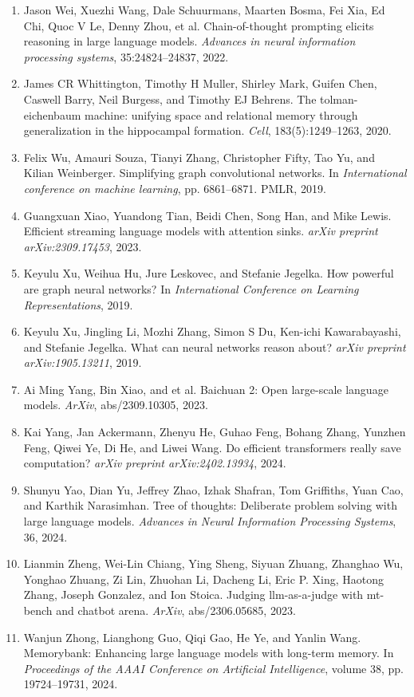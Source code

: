 \documentclass[11pt,UTF8,fontset=fandol]{ctexart}
\begin{document}
\begin{enumerate}[leftmargin=2em]
\item Jason Wei, Xuezhi Wang, Dale Schuurmans, Maarten Bosma, Fei Xia, Ed Chi, Quoc V Le, Denny Zhou, et al. Chain-of-thought prompting elicits reasoning in large language models. \textit{Advances in neural information processing systems}, 35:24824--24837, 2022.
\item James CR Whittington, Timothy H Muller, Shirley Mark, Guifen Chen, Caswell Barry, Neil Burgess, and Timothy EJ Behrens. The tolman-eichenbaum machine: unifying space and relational memory through generalization in the hippocampal formation. \textit{Cell}, 183(5):1249--1263, 2020.
\item Felix Wu, Amauri Souza, Tianyi Zhang, Christopher Fifty, Tao Yu, and Kilian Weinberger. Simplifying graph convolutional networks. In \textit{International conference on machine learning}, pp. 6861--6871. PMLR, 2019.
\item Guangxuan Xiao, Yuandong Tian, Beidi Chen, Song Han, and Mike Lewis. Efficient streaming language models with attention sinks. \textit{arXiv preprint arXiv:2309.17453}, 2023.
\item Keyulu Xu, Weihua Hu, Jure Leskovec, and Stefanie Jegelka. How powerful are graph neural networks? In \textit{International Conference on Learning Representations}, 2019.
\item Keyulu Xu, Jingling Li, Mozhi Zhang, Simon S Du, Ken-ichi Kawarabayashi, and Stefanie Jegelka. What can neural networks reason about? \textit{arXiv preprint arXiv:1905.13211}, 2019.
\item Ai Ming Yang, Bin Xiao, and et al. Baichuan 2: Open large-scale language models. \textit{ArXiv}, abs/2309.10305, 2023.
\item Kai Yang, Jan Ackermann, Zhenyu He, Guhao Feng, Bohang Zhang, Yunzhen Feng, Qiwei Ye, Di He, and Liwei Wang. Do efficient transformers really save computation? \textit{arXiv preprint arXiv:2402.13934}, 2024.
\item Shunyu Yao, Dian Yu, Jeffrey Zhao, Izhak Shafran, Tom Griffiths, Yuan Cao, and Karthik Narasimhan. Tree of thoughts: Deliberate problem solving with large language models. \textit{Advances in Neural Information Processing Systems}, 36, 2024.
\item Lianmin Zheng, Wei-Lin Chiang, Ying Sheng, Siyuan Zhuang, Zhanghao Wu, Yonghao Zhuang, Zi Lin, Zhuohan Li, Dacheng Li, Eric P. Xing, Haotong Zhang, Joseph Gonzalez, and Ion Stoica. Judging llm-as-a-judge with mt-bench and chatbot arena. \textit{ArXiv}, abs/2306.05685, 2023.
\item Wanjun Zhong, Lianghong Guo, Qiqi Gao, He Ye, and Yanlin Wang. Memorybank: Enhancing large language models with long-term memory. In \textit{Proceedings of the AAAI Conference on Artificial Intelligence}, volume 38, pp. 19724--19731, 2024.
\end{enumerate}
\end{document}
